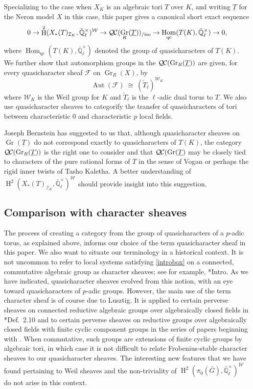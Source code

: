 \documentclass{amsart}
\theoremstyle{plain}
\theoremstyle{definition}
\theoremstyle{remark}
\newcommand{\EE}{\mathbb{\bar Q}_\ell}
\newcommand{\EEx}{\EE^\times}
\newcommand{\Weil}[1]{\mathcal{W}_{#1}}
\DeclareMathOperator{\Aut}{Aut}
\DeclareMathOperator{\Hom}{Hom}
\DeclareMathOperator{\Gr}{Gr}
\DeclareMathOperator{\Hh}{H}
\newcommand{\iso}{{\ \cong\ }}
\newcommand{\qcs}[1]{{\mathcal{#1}}}
\newcommand{\QC}{{\mathcal{Q\hskip-0.8pt C}}}
\newcommand{\QCiso}[1]{\QC(#1)_{/\text{iso}}}
\begin{document}
Specializing to the case when $X_K$ is an algebraic tori $T$ over $K$, and writing $\underline{T}$ for the Neron model $X$ in this case, this paper gives a canonical short exact sequence 
\begin{equation}
0 \to \Hh^2(X_*(T)_{\mathcal{I}_K},\EEx)^{\Weil{}} \to \QCiso{\Gr_R(\underline{T})} \to \Hom_\text{qc}(T(K),\EEx) \to 0,
\end{equation}
where $\Hom_\text{qc}(T(K),\EEx)$ denoted the group of quasicharacters of $T(K)$.
We further show that automorphism groups in the $\QC(\Gr_R(\underline{T}))$ are given, for every quasicharacter sheaf $\qcs{F}$ on $\Gr_R(X)$, by
\begin{equation}
\Aut(\qcs{F}) \iso (\check{T}_\ell)^{\Weil{K}}
\end{equation}
where $\Weil{K}$ is the Weil group for $K$ and $\check{T}_\ell$ is the $\ell$-adic dual torus to $T$.
We also use quasicharacter sheaves to categorify the transfer of quasicharacters of tori between characteristic $0$ and characteristic $p$ local fields.

Joseph Bernstein has suggested to us that, although quasicharacter sheaves on $\Gr(\underline{T})$ do not correspond exactly to quasicharacters of $T(K)$, the category $\QC(\Gr_R(\underline{T}))$ is the right one to consider and that $\QC(\Gr(\underline{T})$ may be closely tied to characters of  the pure rational forms of $T$ in the sense of Vogan \cite{vogan:93a} or perhaps the rigid inner twists of Tasho Kaletha. 
A better understanding of 
$\Hh^2(X_*(T)_{\mathcal{I}_K},\EEx)^{\Weil{}}$ should provide insight into this suggestion.

\subsection{Comparison with character sheaves}

The process of creating a category from the group of quasicharacters of a $p$-adic  torus, as explained above, informs our choice of the term quasicharacter sheaf in this paper.
We also want to situate our terminology in a historical context.
It is not uncommon to refer to local systems satisfying \eqref{introbox} on a connected, commutative algebraic group as character sheaves;
see for example, \cite{kamgarpour:09a}*{Intro}.
As we have indicated, quasicharacter sheaves evolved from this notion,
with an eye toward quasicharacters of $p$-adic groups.
However, the main use of the term character sheaf is of course due to Lusztig.
It is applied to certain perverse sheaves on connected reductive algebraic groups over algebraically closed fields in
\cite{lusztig:85a}*{Def.~2.10} and to certain perverse sheaves on reductive groups
over algebraically closed fields with finite cyclic component groups in the series of papers
beginning with \cite{lusztig:disconnected1}.
When commutative, such groups are extensions of finite cyclic groups by algebraic tori,
in which case it is not difficult to relate Frobenius-stable character sheaves to our quasicharacter sheaves.
The interesting new features that we have found pertaining to Weil sheaves and the non-triviality of $\Hh^2(\pi_0({\bar G}),\EEx)^{\Weil{}}$ do not arise in this context.
\end{document}
